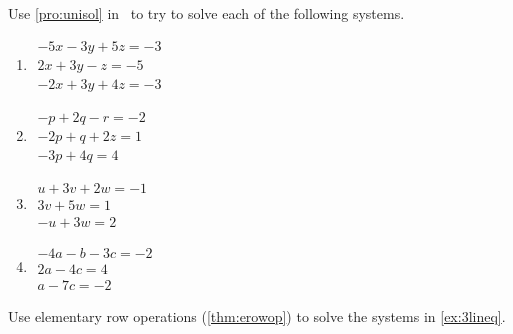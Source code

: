 \begin{exercise} \label{ex:3lineq} 
Use \autoref{pro:unisol} in \script\ to try to solve each of the following systems.
\begin{enumerate}
\item \(\begin{array}{l}
-5x  -3y   +5z=  -3 \\
   2x   +3y  -z = -5\\
  -2x   +3y   +4z=  -3
\end{array}\)

\item \(\begin{array}{l}
-p   +2q  -r=  -2\\
  -2p   +q   +2z=   1\\
  -3p   +4q=   4\end{array}\)

\item \(\begin{array}{l}
u   +3v   +2w=  -1\\
      3v   +5w=   1\\
  -u      +3w=   2\end{array}\)

\item \(\begin{array}{l}
-4a  -b  -3c=  -2\\
   2a    -4c=   4\\
   a     -7c=  -2\end{array}\)

%
\end{enumerate}
\end{exercise}


\begin{exercise} \label{ex:} 
Use elementary row operations (\autoref{thm:erowop}) to solve the systems in \autoref{ex:3lineq}.
\end{exercise}





